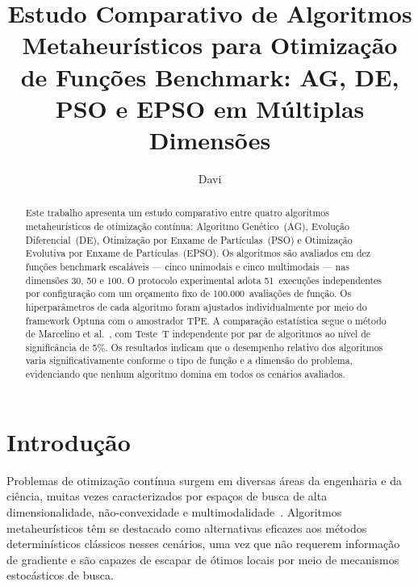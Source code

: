 \documentclass[runningheads]{llncs}
\begin{document}
\title{Estudo Comparativo de Algoritmos Metaheurísticos para
Otimização de Fun\c{c}\~{o}es Benchmark: AG, DE, PSO e EPSO
em M\'{u}ltiplas Dimens\~{o}es}


\author{Davi}


\maketitle

\begin{abstract}
Este trabalho apresenta um estudo comparativo entre quatro algoritmos
metaheurísticos de otimização contínua: Algoritmo Genético~(AG),
Evolução Diferencial~(DE), Otimização por Enxame de Partículas~(PSO)
e Otimização Evolutiva por Enxame de Partículas~(EPSO). Os algoritmos
são avaliados em dez funções benchmark escaláveis — cinco unimodais e
cinco multimodais — nas dimensões 30, 50 e 100. O protocolo experimental
adota 51~execuções independentes por configuração com um orçamento fixo
de 100.000~avaliações de função. Os hiperparâmetros de cada algoritmo
foram ajustados individualmente por meio do framework Optuna com o
amostrador TPE\@. A comparação estatística segue o método de Marcelino
et al.~\cite{marcelino2018}, com Teste~T independente por par de
algoritmos ao nível de significância de 5\%. Os resultados indicam que
o desempenho relativo dos algoritmos varia significativamente conforme
o tipo de função e a dimensão do problema, evidenciando que nenhum
algoritmo domina em todos os cenários avaliados.

\end{abstract}

\section{Introdução}\label{sec:intro}

Problemas de otimização contínua surgem em diversas áreas da engenharia
e da ciência, muitas vezes caracterizados por espaços de busca de alta
dimensionalidade, não-convexidade e multimodalidade~\cite{storn1997}.
Algoritmos metaheurísticos têm se destacado como alternativas eficazes
aos métodos determinísticos clássicos nesses cenários, uma vez que não
requerem informação de gradiente e são capazes de escapar de ótimos
locais por meio de mecanismos estocásticos de busca.
\end{document}
